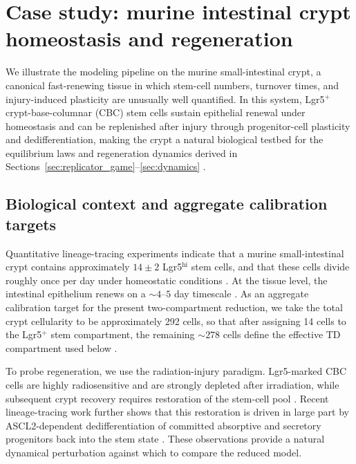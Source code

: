 \documentclass[pdflatex,sn-mathphys-ay]{sn-jnl}
\theoremstyle{thmstyleone}
\theoremstyle{definition}
\theoremstyle{remark}
\begin{document}
\section{Case study: murine intestinal crypt homeostasis and regeneration}
\label{sec:case_study}

We illustrate the modeling pipeline on the murine small-intestinal crypt, a canonical
fast-renewing tissue in which stem-cell numbers, turnover times, and injury-induced
plasticity are unusually well quantified. In this system, Lgr5$^+$ crypt-base-columnar
(CBC) stem cells sustain epithelial renewal under homeostasis and can be replenished
after injury through progenitor-cell plasticity and dedifferentiation, making the crypt
a natural biological testbed for the equilibrium laws and regeneration dynamics derived
in Sections~\ref{sec:replicator_game}--\ref{sec:dynamics}
\citep{snippert_intestinal_2010,hagemann_quantitation_1970,van_der_flier_stem_2009,murata_ascl2-dependent_2020}.

\subsection{Biological context and aggregate calibration targets}
\label{subsec:crypt_biology}

Quantitative lineage-tracing experiments indicate that a murine small-intestinal crypt
contains approximately $14\pm2$ Lgr5$^{\mathrm{hi}}$ stem cells, and that these cells
divide roughly once per day under homeostatic conditions \citep{snippert_intestinal_2010}. At the
tissue level, the intestinal epithelium renews on a $\sim 4$--$5$ day timescale
\citep{van_der_flier_stem_2009}. As an aggregate calibration target for the present
two-compartment reduction, we take the total crypt cellularity to be approximately
292 cells, so that after assigning 14 cells to the Lgr5$^+$ stem compartment, the
remaining $\sim278$ cells define the effective TD compartment used below
\citep{hagemann_quantitation_1970}.

To probe regeneration, we use the radiation-injury paradigm. Lgr5-marked CBC cells are
highly radiosensitive and are strongly depleted after irradiation, while subsequent crypt
recovery requires restoration of the stem-cell pool \citep{richmond_enduring_2016}.
Recent lineage-tracing work further shows that this restoration is driven in large part
by ASCL2-dependent dedifferentiation of committed absorptive and secretory progenitors
back into the stem state \citep{murata_ascl2-dependent_2020}. These observations provide a natural
dynamical perturbation against which to compare the reduced model.
\end{document}
